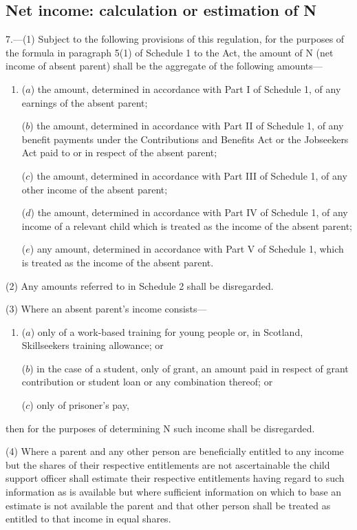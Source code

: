\documentclass[12pt,a4paper]{article}
\begin{document}
\subsection[7. Net income: calculation or estimation of N]{Net income: calculation or estimation of N}

7.—(1) Subject to the following provisions of this regulation, for the purposes of the formula in paragraph 5(1) of Schedule 1 to the Act, the amount of N (net income of absent parent) shall be the aggregate of the following amounts—
\begin{enumerate}\item[]
($a$) the amount, determined in accordance with Part I of Schedule 1, of any earnings of the absent parent;

($b$) the amount, determined in accordance with Part II of Schedule 1, of any benefit payments under the Contributions and Benefits Act 
or the Jobseekers Act  %
paid to or in respect of the absent parent;

($c$) the amount, determined in accordance with Part III of Schedule 1, of any other income of the absent parent;

($d$) the amount, determined in accordance with Part IV of Schedule 1, of any income of a relevant child which is treated as the income of the absent parent;

($e$) any amount, determined in accordance with Part V of Schedule 1, which is treated as the income of the absent parent.
\end{enumerate}

(2) Any amounts referred to in Schedule 2 shall be disregarded.

(3) Where an absent parent’s income consists—
\begin{enumerate}\item[]
($a$) only of a 
work-based training for young people or, in Scotland, Skillseekers training  %
allowance; or

($b$) in the case of a student, only of grant, an amount paid in respect of grant contribution or student loan or any combination thereof; or

($c$) only of prisoner’s pay,
\end{enumerate}
then for the purposes of determining N such income shall be disregarded.

(4) Where a parent and any other person are beneficially entitled to any income but the shares of their respective entitlements are not ascertainable the child support officer shall estimate their respective entitlements having regard to such information as is available but where sufficient information on which to base an estimate is not available the parent and that other person shall be treated as entitled to that income in equal shares.
\end{document}
